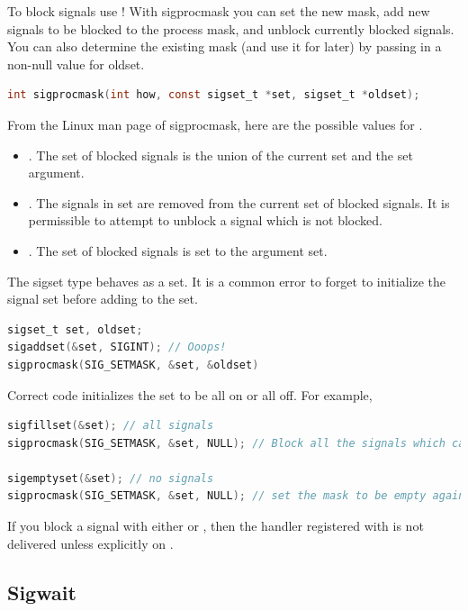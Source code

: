 To block signals use !
With sigprocmask you can set the new mask, add new signals to be blocked to the process mask, and unblock currently blocked signals.
You can also determine the existing mask (and use it for later) by passing in a non-null value for oldset.

\begin{lstlisting}[language=C]
int sigprocmask(int how, const sigset_t *set, sigset_t *oldset);
\end{lstlisting}

From the Linux man page of sigprocmask, here are the possible values for  .

\begin{itemize}
\item {}.
  The set of blocked signals is the union of the current set and the set argument.
\item {}.
  The signals in set are removed from the current set of blocked signals.
  It is permissible to attempt to unblock a signal which is not blocked.
\item {}.
  The set of blocked signals is set to the argument set.
\end{itemize}

The sigset type behaves as a set.
It is a common error to forget to initialize the signal set before adding to the set.

\begin{lstlisting}[language=C]
sigset_t set, oldset;
sigaddset(&set, SIGINT); // Ooops!
sigprocmask(SIG_SETMASK, &set, &oldset)
\end{lstlisting}

Correct code initializes the set to be all on or all off. For example,

\begin{lstlisting}[language=C]
sigfillset(&set); // all signals
sigprocmask(SIG_SETMASK, &set, NULL); // Block all the signals which can be blocked

sigemptyset(&set); // no signals
sigprocmask(SIG_SETMASK, &set, NULL); // set the mask to be empty again
\end{lstlisting}

If you block a signal with either  or , then the handler registered with  is not delivered unless explicitly  on .

\subsection{Sigwait}

